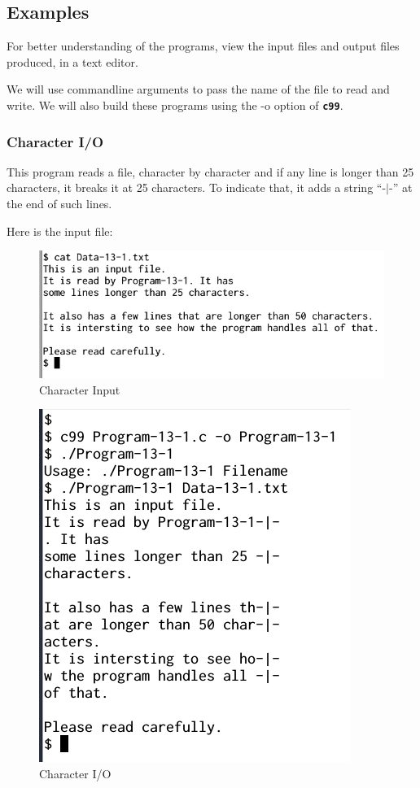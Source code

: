\documentclass[11pt,a4paper]{article}
\begin{document}
\subsection*{Examples}

For better understanding of the programs, view the input files and output files produced, in a text editor.

We will use commandline arguments to pass the name of the file to read and write. We will also build these programs using the -o option of \textbf{\texttt{c99}}.

\subsubsection*{Character I/O}
This program reads a file, character by character and if any line is longer than 25 characters, it breaks it at 25 characters. To indicate that, it adds a string ``-$\mid$-'' at the end of such lines. 

Here is the input file:
\begin{figure}[ht]
\begin{center}
\includegraphics[scale=0.6]{Input-13-1.png}
\caption{Character Input}
\label{input-13-1}
\end{center}
\end{figure}

 

\begin{figure}[ht]
\begin{center}
\includegraphics[scale=0.6]{Output-13-1.png}
\caption{Character I/O}
\label{output-13-1}
\end{center}
\end{figure}
\end{document}
